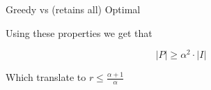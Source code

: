 \begin{frame}{Greedy vs (retains all) Optimal}

Using these properties we get that

\begin{lemma}
$$ |P| \geq \alpha^2 \cdot |I| $$
\end{lemma}


Which translate to $r \leq \frac{\alpha + 1}{\alpha}$


\end{frame}

